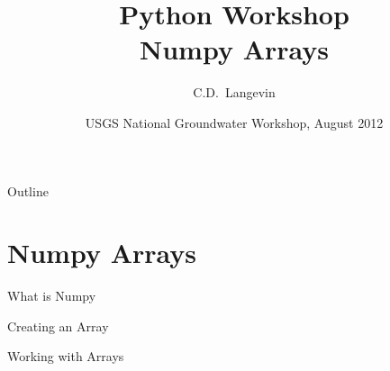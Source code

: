 \documentclass{beamer}
\title[]{Python Workshop\\
Numpy Arrays}
\author[Langevin] %
{C.D.~Langevin}
\institute[USGS] %
{
  U.S. Geological Survey\\
  Reston, Virginia, USA
  }
\date[UQ12] %
{USGS National Groundwater Workshop, August 2012}
\begin{document}
\begin{frame}
  \titlepage
\end{frame}

\begin{frame}{Outline}
\tableofcontents
\end{frame}

\section{Numpy Arrays}
\begin{frame}[fragile]{What is Numpy}
\end{frame}

\begin{frame}[fragile]{Creating an Array}
\end{frame}

\begin{frame}[fragile]{Working with Arrays}
\end{frame}
\end{document}
